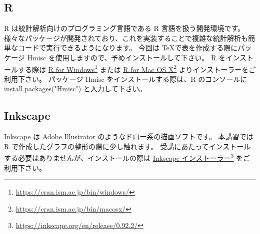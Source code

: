 \subsection*{R}
R は統計解析向けのプログラミング言語である R 言語を扱う開発環境です。
様々なパッケージが開発されており、これを実装することで複雑な統計解析も簡単なコードで実行できるようになります。
今回は \TeX で表を作成する際にパッケージ Hmisc を使用しますので、予めインストールして下さい。
R をインストールする際は \href{https://cran.ism.ac.jp/bin/windows/}{R for Windows}\footnote{\url{https://cran.ism.ac.jp/bin/windows/}} または \href{https://cran.ism.ac.jp/bin/macosx/}{R for Mac OS X}\footnote{\url{https://cran.ism.ac.jp/bin/macosx/}} よりインストーラーをご利用下さい。
パッケージ Hmisc をインストールする際は、R のコンソールに install.packages("Hmisc") と入力して下さい。





\subsection*{Inkscape}
Inkscape は Adobe Illustrator のようなドロー系の描画ソフトです。
本講習では R で作成したグラフの整形の際に少し触れます。
受講にあたってインストールする必要はありませんが、インストールの際は \href{https://inkscape.org/en/release/0.92.2/}{Inkscape インストーラー}\footnote{\url{https://inkscape.org/en/release/0.92.2/}} をご利用下さい。


















